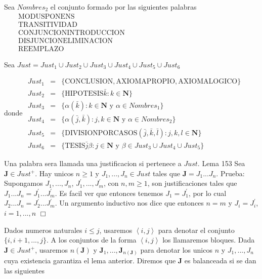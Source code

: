 Sea \(Nombres_{2}\) el conjunto formado por las siguientes palabras
\(\displaystyle \begin{array}{rcl} & & \text{MODUSPONENS} \\ & & \text{TRANSITIVIDAD} \\ & & \text{CONJUNCIONINTRODUCCION} \\ & & \text{DISJUNCIONELIMINACION} \\ & & \text{REEMPLAZO} \end{array} \)

Sea
\(\displaystyle Just=Just_{1}\cup Just_{2}\cup Just_{3}\cup Just_{4}\cup Just_{5}\cup Just_{6} \)

donde
\(\displaystyle \begin{array}{rcl} Just_{1} & =& \{\text{CONCLUSION},\text{AXIOMAPROPIO},\text{AXIOMALOGICO}\} \\ Just_{2} & =& \{\text{HIPOTESIS}\bar{k}:k\in \mathbf{N}\} \\ Just_{3} & =& \{\alpha (\bar{k}):k\in \mathbf{N}\text{ y }\alpha \in Nombres_{1}\} \\ Just_{4} & =& \{\alpha (\bar{j},\bar{k}):j,k\in \mathbf{N}\text{ y }\alpha \in Nombres_{2}\} \\ Just_{5} & =& \{\text{DIVISIONPORCASOS}(\bar{j},\bar{k},\bar{l}):j,k,l\in \mathbf{N}\} \\ Just_{6} & =& \{\text{TESIS}\bar{j}\beta :j\in \mathbf{N}\text{ y }\beta \in Just_{3}\cup Just_{4}\cup Just_{5}\} \end{array} \)

Una palabra sera llamada una justificacion si pertenece a \(Just\).
Lema 153 Sea \(\mathbf{J}\in Just^{+}\). Hay unicos \(n\geq 1\) y \(J_{1},...,J_{n}\in Just\) tales que \(\mathbf{J}=J_{1}...J_{n}\).
Prueba: Supongamos \(J_{1},...,J_{n}\), \(J_{1}^{\prime },...,J_{m}^{\prime }\), con \( n,m\geq 1\), son justificaciones tales que \(J_{1}...J_{n}=J_{1}^{\prime }...J_{m}^{\prime }\). Es facil ver que entonces tenemos \(J_{1}=J_{1}^{\prime }\), por lo cual \(J_{2}...J_{n}=J_{2}^{\prime }...J_{m}^{\prime }\). Un argumento inductivo nos dice que entonces \(n=m\) y \(J_{i}=J_{i}^{\prime }\), \( i=1,...,n\) \(\Box\)

Dados numeros naturales \(i\leq j\), usaremos \(\left\langle i,j\right\rangle \) para denotar el conjunto \(\{i,i+1,...,j\}.\) A los conjuntos de la forma \( \left\langle i,j\right\rangle \) los llamaremos bloques. Dada \( \mathbf{J}\in Just^{+}\), usaremos \(n(\mathbf{J})\) y \(\mathbf{J}_{1},..., \mathbf{J}_{n(\mathbf{J})}\) para denotar los unicos \(n\) y \(J_{1},...,J_{n}\) cuya existencia garantiza el lema anterior. Diremos que \(\mathbf{J}\) es balanceada si se dan las siguientes


